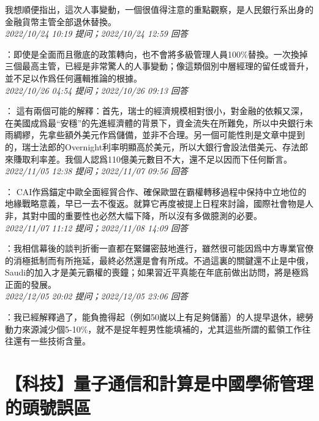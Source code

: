 \documentclass[twocolumn]{ctexart}
\begin{document}
我想順便指出，這次人事變動，一個很值得注意的重點觀察，是人民銀行系出身的金融貨幣主管全部退休替換。
\\

\textit{\hfill\noindent\small 2022/10/24 10:19 提问；2022/10/24 12:59 回答}

：即使是全面而且徹底的政策轉向，也不會將多級管理人員100\%替換。一次換掉三個最高主管，已經是非常驚人的人事變動；像這類個別中層經理的留任或晉升，並不足以作爲任何邏輯推論的根據。
\\

\textit{\hfill\noindent\small 2022/10/26 04:54 提问；2022/10/26 09:13 回答}

：
這有兩個可能的解釋：首先，瑞士的經濟規模相對很小，對金融的依賴又深，在美國成爲最“安穩”的先進經濟體的背景下，資金流失在所難免，所以中央銀行未雨綢繆，先拿些額外美元作爲儲備，並非不合理。另一個可能性則是文章中提到的，瑞士法郎的Overnight利率明顯高於美元，所以大銀行會設法借美元、存法郎來賺取利率差。我個人認爲110億美元數目不大，還不足以因而下任何斷言。
\\

\textit{\hfill\noindent\small 2022/11/05 12:38 提问；2022/11/07 09:56 回答}

：
CAI作爲錨定中歐全面經貿合作、確保歐盟在霸權轉移過程中保持中立地位的地緣戰略意義，早已一去不復返。就算它再度被提上日程來討論，國際社會物是人非，其對中國的重要性也必然大幅下降，所以沒有多做臆測的必要。
\\

\textit{\hfill\noindent\small 2022/11/07 11:12 提问；2022/11/08 14:09 回答}

：我相信幕後的談判折衝一直都在緊鑼密鼓地進行，雖然很可能因爲中方專業官僚的消極抵制而有所拖延，最終必然還是會有所成。不過這裏的關鍵還不止是中俄，Saudi的加入才是美元霸權的喪鐘；如果習近平真能在年底前做出訪問，將是極爲正面的發展。
\\

\textit{\hfill\noindent\small 2022/12/05 20:02 提问；2022/12/05 23:06 回答}

：我已經解釋過了，能負擔得起（例如50嵗以上有足夠儲蓄）的人提早退休，總勞動力來源減少個5-10\%，就不是捉年輕男性能填補的，尤其這些所謂的藍領工作往往還有一些技術含量。
\\


\section{【科技】量子通信和計算是中國學術管理的頭號誤區}
\end{document}
